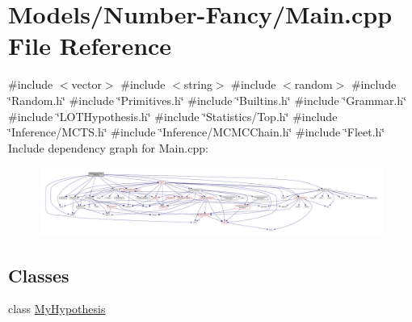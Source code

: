\hypertarget{_models_2_number-_fancy_2main_8cpp}{}\section{Models/\+Number-\/\+Fancy/\+Main.cpp File Reference}
\label{_models_2_number-_fancy_2main_8cpp}
{\ttfamily \#include $<$vector$>$}\newline
{\ttfamily \#include $<$string$>$}\newline
{\ttfamily \#include $<$random$>$}\newline
{\ttfamily \#include \char`\"{}Random.\+h\char`\"{}}\newline
{\ttfamily \#include \char`\"{}Primitives.\+h\char`\"{}}\newline
{\ttfamily \#include \char`\"{}Builtins.\+h\char`\"{}}\newline
{\ttfamily \#include \char`\"{}Grammar.\+h\char`\"{}}\newline
{\ttfamily \#include \char`\"{}L\+O\+T\+Hypothesis.\+h\char`\"{}}\newline
{\ttfamily \#include \char`\"{}Statistics/\+Top.\+h\char`\"{}}\newline
{\ttfamily \#include \char`\"{}Inference/\+M\+C\+T\+S.\+h\char`\"{}}\newline
{\ttfamily \#include \char`\"{}Inference/\+M\+C\+M\+C\+Chain.\+h\char`\"{}}\newline
{\ttfamily \#include \char`\"{}Fleet.\+h\char`\"{}}\newline
Include dependency graph for Main.\+cpp\+:
\nopagebreak
\begin{figure}[H]
\begin{center}
\leavevmode
\includegraphics[width=350pt]{_models_2_number-_fancy_2main_8cpp__incl}
\end{center}
\end{figure}
\subsection*{Classes}
\begin{DoxyCompactItemize}
\item 
class \hyperlink{class_my_hypothesis}{My\+Hypothesis}
\end{DoxyCompactItemize}
